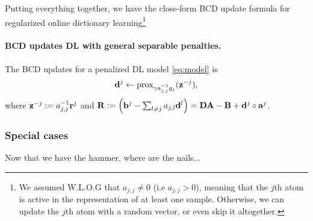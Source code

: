   

Putting everything together, we have the close-form BCD update formula for regularized online dictionary learning\footnote{We assumed W.L.O.G that $a_{j,j} \ne 0$ (i.e $a_{j,j} > 0$), meaning that the $j$th atom is active in the representation of at least one sample. Otherwise, we can update the $j$th atom with a random vector, or even skip it altogether.}
\begin{mdframed}
  \paragraph{BCD updates DL with general separable penalties.}
  The BCD updates for a penalized DL model \eqref{eq:model} is
\begin{equation}
  \mathbf{d}^j \leftarrow \operatorname{prox}_{\gamma a_{j,j}^{-1}g_j}(\mathbf{z}^{-j}),
\end{equation}
where $\mathbf{z}^{-j} := a_{j,j}^{-1}\mathbf{r}^j$ and $\mathbf{R} := \left(\mathbf{b}^j-\sum\nolimits_{l \ne j}a_{j,l}\mathbf{d}^l\right) = \mathbf{DA} - \mathbf{B} + \mathbf{d}^j \circ \mathbf{a}^j $.
\end{mdframed}

\subsubsection{Special cases}
Now that we have the hammer, where are the nails...
